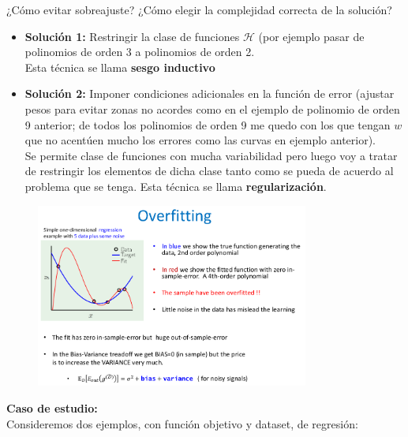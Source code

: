 \documentclass[11pt,a4paper]{article}
\theoremstyle{definition}
\begin{document}
	¿Cómo evitar sobreajuste? ¿Cómo elegir la complejidad correcta de la solución?
	\begin{itemize}
		\item \textbf{Solución 1:} Restringir la clase de funciones $\mathcal{H}$ (por ejemplo pasar de polinomios de orden 3 a polinomios de orden 2.\\
		Esta técnica se llama \textbf{sesgo inductivo}
		\item \textbf{Solución 2:} Imponer condiciones adicionales en la función de error (ajustar pesos para evitar zonas no acordes como en el ejemplo de polinomio de orden 9 anterior; de todos los polinomios de orden 9 me quedo con los que tengan $w$ que no acentúen mucho los errores como las curvas en ejemplo anterior).\\
		Se permite clase de funciones con mucha variabilidad pero luego voy a tratar de restringir los elementos de dicha clase tanto como se pueda de acuerdo al problema que se tenga.
		Esta técnica se llama \textbf{regularización}.
	\end{itemize}
	
	\begin{figure}[H]
		\centering
		\includegraphics[width=0.8\textwidth]{images/overfitting_example2}
	\end{figure}
	
	\textbf{Caso de estudio:}\\
	Consideremos dos ejemplos, con función objetivo y dataset, de regresión:
	
\end{document}
